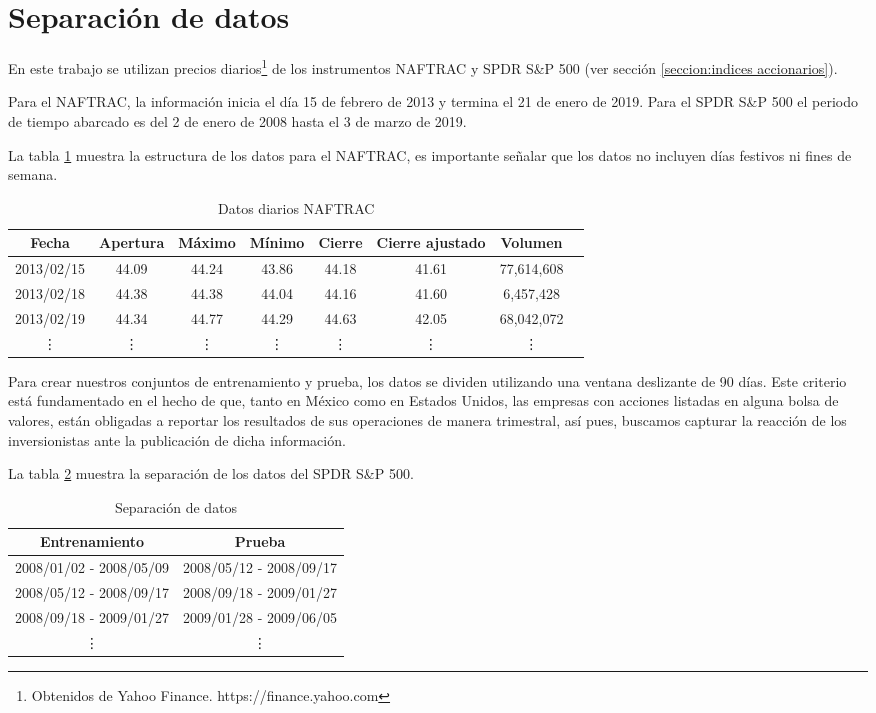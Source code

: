 \documentclass[12pt]{scrbook}
\theoremstyle{break}
\theoremstyle{break}
\begin{document}
\section{Separación de datos}
\label{seccion:separacion de datos}
En este trabajo se utilizan precios diarios\footnote{Obtenidos de Yahoo Finance. https://finance.yahoo.com} de los instrumentos NAFTRAC y SPDR S\&P 500 (ver sección \ref{seccion:indices accionarios}).

Para el NAFTRAC, la información inicia el día 15 de febrero de 2013 y termina el 21 de enero de 2019. Para el SPDR S\&P 500 el periodo de tiempo abarcado es del 2 de enero de 2008 hasta  el 3 de marzo de 2019.

La tabla \ref{tabla:Ejemplo datos diarios NAFTRAC} muestra la estructura de los datos para el NAFTRAC, es importante señalar que los datos no incluyen días festivos ni fines de semana.

\begin{table}[h]
\centering
\begin{tabular}{cccccccc}
\hline
\textbf{Fecha} & \textbf{Apertura} & \textbf{Máximo} & \textbf{Mínimo} & \textbf{Cierre} & \textbf{Cierre ajustado} & \textbf{Volumen} \\
\hline
2013/02/15 & 44.09 & 44.24 & 43.86 & 44.18 & 41.61 & 77,614,608\\
2013/02/18 & 44.38 & 44.38 & 44.04 & 44.16 & 41.60 & 6,457,428\\
2013/02/19 & 44.34 & 44.77 & 44.29 & 44.63 & 42.05 & 68,042,072\\
\vdots & \vdots & \vdots & \vdots & \vdots & \vdots & \vdots \\
\hline
\end{tabular}
\caption{\label{tabla:Ejemplo datos diarios NAFTRAC} Datos diarios NAFTRAC}
\end{table}

Para crear nuestros conjuntos de entrenamiento y prueba, los datos se dividen utilizando una ventana deslizante de 90 días. Este criterio está fundamentado en el hecho de que, tanto en México como en Estados Unidos, las empresas con acciones listadas en alguna bolsa de valores, están obligadas a reportar los resultados de sus operaciones de manera trimestral, así pues, buscamos capturar la reacción de los inversionistas ante la publicación de dicha información.

La tabla \ref{tabla:data split SP500} muestra la separación de los datos del SPDR S\&P 500.
\begin{table}[h]
\centering
\begin{tabular}{cc}
\hline
\textbf{Entrenamiento} & \textbf{Prueba} \\
\hline
2008/01/02 - 2008/05/09 & 2008/05/12 - 2008/09/17 \\
2008/05/12 - 2008/09/17 & 2008/09/18 - 2009/01/27 \\
2008/09/18 - 2009/01/27 & 2009/01/28 - 2009/06/05 \\
\vdots & \vdots \\
\hline
\end{tabular}
\caption{\label{tabla:data split SP500} Separación de datos}
\end{table}
\end{document}
